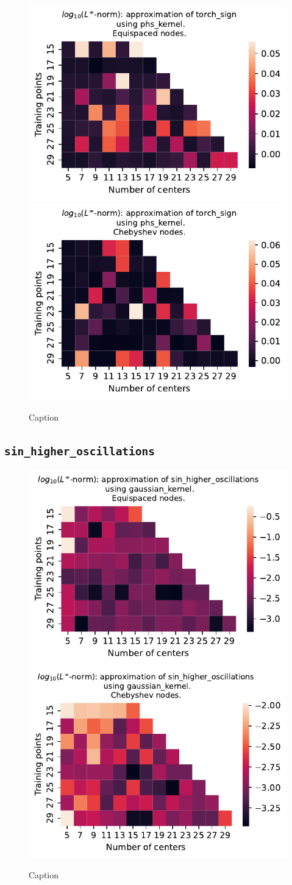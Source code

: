 \documentclass[12pt]{report} %
\begin{document}
\begin{figure}[ht]
    \centering
    \includegraphics[width=.49\textwidth]{imagenes/experiments/1d/variational/torch_sign-Kphs_kernel-Equi.pdf}
    \includegraphics[width=.49\textwidth]{imagenes/experiments/1d/variational/torch_sign-Kphs_kernel-Cheb.pdf}
    \caption{Caption}
    \label{fig:torch-sign-phs}
\end{figure}

\subsection*{\texttt{sin\_higher\_oscillations}}

\begin{figure}[ht]
    \centering
    
    \includegraphics[width=.49\textwidth]{imagenes/experiments/1d/variational/sin_higher_oscillations-Kgaussian_kernel-Equi.pdf}
    \includegraphics[width=.49\textwidth]{imagenes/experiments/1d/variational/sin_higher_oscillations-Kgaussian_kernel-Cheb.pdf}
    \caption{Caption}
    \label{fig:sin-higher-oscillations-gaussian}
\end{figure}
\end{document}
